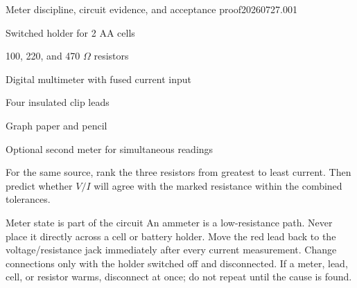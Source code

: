 

  {Meter discipline, circuit evidence, and acceptance proof}{20260727.001}

\newcommand{\blank}[1]{\rule{#1}{.35pt}}
\newcommand{\meter}[3]{%
  \node[draw,very thick,rounded corners=2pt,minimum width=1.05cm,
    minimum height=.72cm,align=center,font=\scriptsize] (#1) at #2 {#3};}
\newcommand{\battery}[1]{%
  \draw[very thick] (#1,0)--++(.35,0);
  \draw[very thick] ($(#1,0)+(.35,-.32)$)--++(0,.64);
  \draw[very thick] ($(#1,0)+(.55,-.18)$)--++(0,.36);
  \draw[very thick] ($(#1,0)+(.55,0)$)--++(.35,0);}
\newcommand{\resistor}[1]{%
  \draw[very thick] (#1,0)--++(.22,0)
    --++(.12,.2)--++(.2,-.4)--++(.2,.4)--++(.2,-.4)
    --++(.12,.2)--++(.22,0);}
\newcommand{\switchoff}[1]{%
  \draw[very thick] (#1,0)--++(.25,0);
  \fill ($(#1,0)+(.25,0)$) circle (.045);
  \fill ($(#1,0)+(.75,0)$) circle (.045);
  \draw[very thick] ($(#1,0)+(.25,0)$)--++(.42,.26);
  \draw[very thick] ($(#1,0)+(.75,0)$)--++(.25,0);}
\newcommand{\switchon}[1]{%
  \draw[very thick] (#1,0)--++(.25,0);
  \fill ($(#1,0)+(.25,0)$) circle (.045);
  \fill ($(#1,0)+(.75,0)$) circle (.045);
  \draw[very thick] ($(#1,0)+(.25,0)$)--++(.5,0);
  \draw[very thick] ($(#1,0)+(.75,0)$)--++(.25,0);}
\newcommand{\statecaption}[1]{\par\smallskip\footnotesize #1}


\rolecard

\begin{materials}
\item Switched holder for 2 AA cells
\item 100, 220, and 470 \(\Omega\) resistors
\item Digital multimeter with fused current input
\item Four insulated clip leads
\item Graph paper and pencil
\item Optional second meter for simultaneous readings
\end{materials}

\begin{predict}
For the same source, rank the three resistors from greatest to least current.
Then predict whether \(V/I\) will agree with the marked resistance within the
combined tolerances.
\end{predict}

\begin{teloshazard}{Meter state is part of the circuit}
An ammeter is a low-resistance path. Never place it directly across a cell or
battery holder. Move the red lead back to the voltage/resistance jack
immediately after every current measurement. Change connections only with the
holder switched off and disconnected. If a meter, lead, cell, or resistor
warms, disconnect at once; do not repeat until the cause is found.
\end{teloshazard}

